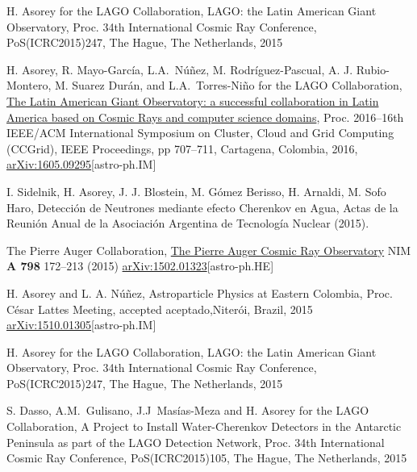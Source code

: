 \begin{etaremune}
\item {}H. Asorey for the LAGO Collaboration, {{LAGO: the Latin American Giant Observatory}}, \en Proc.
34th International Cosmic Ray Conference, PoS(ICRC2015)247, The Hague, The Netherlands, 2015

\item {} H. Asorey, R. Mayo-García, L.A.\ Núñez, M. Rodríguez-Pascual, A. J. Rubio-Montero, M. Suarez Durán, and L.A.\ Torres-Niño for the LAGO Collaboration, {{\href{http://dx.doi.org/10.1109/CCGrid.2016.110}{The Latin American Giant Observatory: a successful collaboration in Latin America based on Cosmic Rays and computer science domains}}}, \en Proc.
2016--16th IEEE/ACM International Symposium on Cluster, Cloud and Grid Computing (CCGrid), IEEE Proceedings, pp 707--711, Cartagena, Colombia, 2016, \href{http://arxiv.org/abs/1605.09295}{arXiv:1605.09295}[astro-ph.IM]

\item {} I. Sidelnik, H. Asorey, J. J. Blostein, M. Gómez Berisso, H. Arnaldi, M. Sofo Haro, {{Detección de Neutrones mediante efecto Cherenkov en Agua}}, Actas de la Reunión Anual de la Asociación Argentina de Tecnología Nuclear (2015).

\item {}The Pierre Auger Collaboration, \href{http://dx.doi.org/10.1016/j.nima.2015.06.058}{{The Pierre Auger Cosmic Ray Observatory}} NIM {\textbf{A 798}} 172--213 (2015) \href{http://arxiv.org/abs/1502.01323}{arXiv:1502.01323}[astro-ph.HE]

\item {}H. Asorey and L. A. Núñez, {{Astroparticle Physics at Eastern Colombia}}, \en Proc.
César Lattes Meeting, \ifeng accepted \else aceptado,\fi Niterói, Brazil, 2015 \href{http://arxiv.org/abs/1510.01305}{arXiv:1510.01305}[astro-ph.IM]

\item {}H. Asorey for the LAGO Collaboration, {{LAGO: the Latin American Giant Observatory}}, \en Proc.
34th International Cosmic Ray Conference, PoS(ICRC2015)247, The Hague, The Netherlands, 2015

\item {}S. Dasso, A.M.\ Gulisano, J.J\  Masías-Meza and H. Asorey for the LAGO Collaboration, {{A Project to Install Water-Cherenkov Detectors in the Antarctic Peninsula as part of the LAGO Detection Network}}, \en Proc.
34th International Cosmic Ray Conference, PoS(ICRC2015)105, The Hague, The Netherlands, 2015


\end{etaremune}
